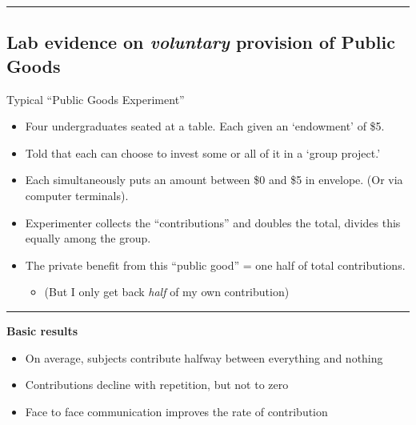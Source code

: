 \documentclass[]{article}
\providecommand{\tightlist}{%
  \setlength{\itemsep}{0pt}\setlength{\parskip}{0pt}}
\begin{document}
\begin{center}\rule{0.5\linewidth}{\linethickness}\end{center}

\hypertarget{lab-evidence-on-voluntary-provision-of-public-goods}{%
\subsection{\texorpdfstring{Lab evidence on \emph{voluntary} provision of Public Goods}{Lab evidence on voluntary provision of Public Goods}}\label{lab-evidence-on-voluntary-provision-of-public-goods}}

Typical ``Public Goods Experiment''

\begin{itemize}
\tightlist
\item
  Four undergraduates seated at a table. Each given an `endowment' of \$5.
\item
  Told that each can choose to invest some or all of it in a `group project.'
\end{itemize}

\bigskip

\begin{itemize}
\item
  Each simultaneously puts an amount between \$0 and \$5 in envelope. (Or via computer terminals).
\item
  Experimenter collects the ``contributions'' and doubles the total, divides this equally among the group.
\item
  The private benefit from this ``public good'' = one half of total contributions.

  \begin{itemize}
  \tightlist
  \item
    (But I only get back \emph{half} of my own contribution)
  \end{itemize}
\end{itemize}

\begin{center}\rule{0.5\linewidth}{\linethickness}\end{center}

\textbf{Basic results}

\begin{itemize}
\tightlist
\item
  On average, subjects contribute halfway between everything and nothing
\item
  Contributions decline with repetition, but not to zero
\item
  Face to face communication improves the rate of contribution
\end{itemize}
\end{document}
